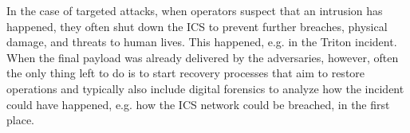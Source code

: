 \documentclass[runningheads]{llncs}
\begin{document}
In the case of targeted attacks, when operators suspect that an intrusion has happened, they often shut down the ICS to prevent further breaches, physical damage, and threats to human lives.
This happened, e.g. in the Triton incident.
When the final payload was already delivered by the adversaries, however, often the only thing left to do is to start recovery processes that aim to restore operations and typically also include digital forensics to analyze how the incident could have happened, e.g. how the ICS network could be breached, in the first place.
\end{document}
